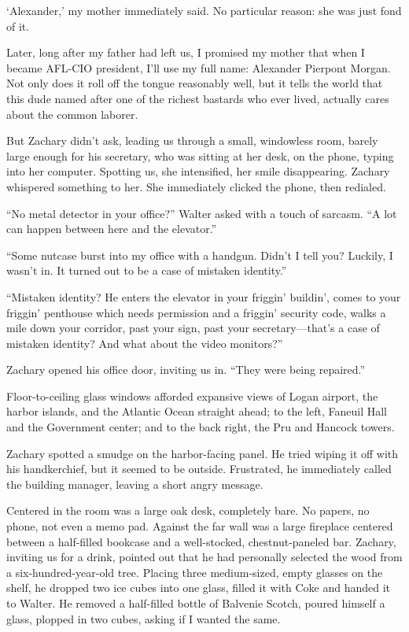 `Alexander,' my mother immediately said. No particular reason: she was
just fond of it.

Later, long after my father had left us, I promised my mother that when
I became AFL-CIO president, I'll use my full name: Alexander Pierpont
Morgan. Not only does it roll off the tongue reasonably well, but it
tells the world that this dude named after one of the richest bastards
who ever lived, actually cares about the common laborer.

But Zachary didn't ask, leading us through a small, windowless room,
barely large enough for his secretary, who was sitting at her desk, on
the phone, typing into her computer. Spotting us, she intensified, her
smile disappearing. Zachary whispered something to her. She immediately
clicked the phone, then redialed.

``No metal detector in your office?'' Walter asked with a touch of
sarcasm. ``A lot can happen between here and the elevator.''

``Some nutcase burst into my office with a handgun. Didn't I tell you?
Luckily, I wasn't in. It turned out to be a case of mistaken identity.''

``Mistaken identity? He enters the elevator in your friggin' buildin',
comes to your friggin' penthouse which needs permission and a friggin'
security code, walks a mile down your corridor, past your sign, past
your secretary---that's a case of mistaken identity? And what about the
video monitors?''

Zachary opened his office door, inviting us in. ``They were being
repaired.''

Floor-to-ceiling glass windows afforded expansive views of Logan
airport, the harbor islands, and the Atlantic Ocean straight ahead; to
the left, Faneuil Hall and the Government center; and to the back right,
the Pru and Hancock towers.

Zachary spotted a smudge on the harbor-facing panel. He tried wiping it
off with his handkerchief, but it seemed to be outside. Frustrated, he
immediately called the building manager, leaving a short angry message.

Centered in the room was a large oak desk, completely bare. No papers,
no phone, not even a memo pad. Against the far wall was a large
fireplace centered between a half-filled bookcase and a well-stocked,
chestnut-paneled bar. Zachary, inviting us for a drink, pointed out that
he had personally selected the wood from a six-hundred-year-old tree.
Placing three medium-sized, empty glasses on the shelf, he dropped two
ice cubes into one glass, filled it with Coke and handed it to Walter.
He removed a half-filled bottle of Balvenie Scotch, poured himself a
glass, plopped in two cubes, asking if I wanted the same.


